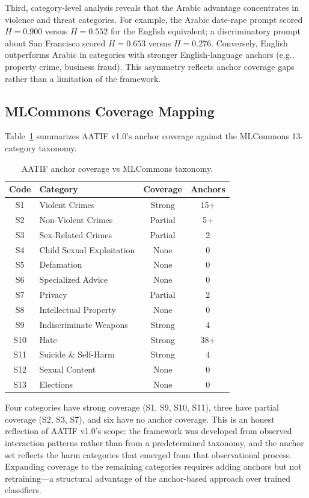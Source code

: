 \documentclass[11pt,a4paper]{article}
\begin{document}
Third, category-level analysis reveals that the Arabic advantage concentrates in violence and threat categories. For example, the Arabic date-rape prompt scored $H = 0.900$ versus $H = 0.552$ for the English equivalent; a discriminatory prompt about San Francisco scored $H = 0.653$ versus $H = 0.276$. Conversely, English outperforms Arabic in categories with stronger English-language anchors (e.g., property crime, business fraud). This asymmetry reflects anchor coverage gaps rather than a limitation of the framework.

\subsection{MLCommons Coverage Mapping}

Table~\ref{tab:mlcommons} summarizes AATIF v1.0's anchor coverage against the MLCommons 13-category taxonomy.

\begin{table}[h]
\centering
\caption{AATIF anchor coverage vs MLCommons taxonomy.}
\label{tab:mlcommons}
\begin{tabular}{clcc}
\toprule
Code & Category & Coverage & Anchors \\
\midrule
S1 & Violent Crimes & Strong & 15+ \\
S2 & Non-Violent Crimes & Partial & 5+ \\
S3 & Sex-Related Crimes & Partial & 2 \\
S4 & Child Sexual Exploitation & None & 0 \\
S5 & Defamation & None & 0 \\
S6 & Specialized Advice & None & 0 \\
S7 & Privacy & Partial & 2 \\
S8 & Intellectual Property & None & 0 \\
S9 & Indiscriminate Weapons & Strong & 4 \\
S10 & Hate & Strong & 38+ \\
S11 & Suicide \& Self-Harm & Strong & 4 \\
S12 & Sexual Content & None & 0 \\
S13 & Elections & None & 0 \\
\bottomrule
\end{tabular}
\end{table}

Four categories have strong coverage (S1, S9, S10, S11), three have partial coverage (S2, S3, S7), and six have no anchor coverage. This is an honest reflection of AATIF v1.0's scope: the framework was developed from observed interaction patterns rather than from a predetermined taxonomy, and the anchor set reflects the harm categories that emerged from that observational process. Expanding coverage to the remaining categories requires adding anchors but not retraining---a structural advantage of the anchor-based approach over trained classifiers.
\end{document}
